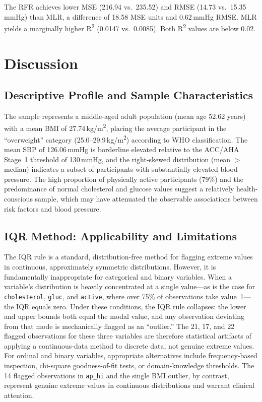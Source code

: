 ﻿\documentclass[conference]{IEEEtran}
\begin{document}
The RFR achieves lower MSE (216.94 vs.\ 235.52) and RMSE (14.73 vs.\ 15.35\,mmHg) than MLR, a difference of 18.58 MSE units and 0.62\,mmHg RMSE. MLR yields a marginally higher R\textsuperscript{2} (0.0147 vs.\ 0.0085). Both R\textsuperscript{2} values are below 0.02.

\section{Discussion}
\label{sec:discussion}

\subsection{Descriptive Profile and Sample Characteristics}

The sample represents a middle-aged adult population (mean age 52.62 years) with a mean BMI of 27.74\,kg/m\textsuperscript{2}, placing the average participant in the ``overweight'' category (25.0--29.9\,kg/m\textsuperscript{2}) according to WHO classification. The mean SBP of 126.06\,mmHg is borderline elevated relative to the ACC/AHA Stage~1 threshold of 130\,mmHg, and the right-skewed distribution (mean $>$ median) indicates a subset of participants with substantially elevated blood pressure. The high proportion of physically active participants (79\%) and the predominance of normal cholesterol and glucose values suggest a relatively health-conscious sample, which may have attenuated the observable associations between risk factors and blood pressure.

\subsection{IQR Method: Applicability and Limitations}

The IQR rule is a standard, distribution-free method for flagging extreme values in continuous, approximately symmetric distributions. However, it is fundamentally inappropriate for categorical and binary variables. When a variable's distribution is heavily concentrated at a single value---as is the case for \texttt{cholesterol}, \texttt{gluc}, and \texttt{active}, where over 75\% of observations take value~1---the IQR equals zero. Under these conditions, the IQR rule collapses: the lower and upper bounds both equal the modal value, and any observation deviating from that mode is mechanically flagged as an ``outlier.'' The 21, 17, and 22 flagged observations for these three variables are therefore statistical artifacts of applying a continuous-data method to discrete data, not genuine extreme values. For ordinal and binary variables, appropriate alternatives include frequency-based inspection, chi-square goodness-of-fit tests, or domain-knowledge thresholds. The 14 flagged observations in \texttt{ap\_hi} and the single BMI outlier, by contrast, represent genuine extreme values in continuous distributions and warrant clinical attention.
\end{document}
